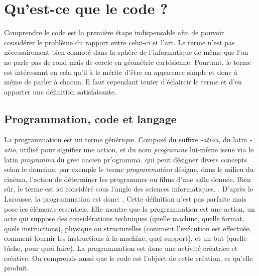 \documentclass[12pt]{article} %
\begin{document}
\section{Qu'est-ce que le code ?}
Comprendre le code est la première étape indispensable afin de pouvoir considérer le problème du rapport entre celui-ci et l'art. Le terme n'est pas nécessairement bien connoté dans la sphère de l'informatique de même que l'on ne parle pas de rond mais de cercle en géométrie cartésienne. Pourtant, le terme est intéressant en cela qu'il à le mérite d'être en apparence simple et donc à même de parler à chacun. Il faut cependant tenter d'éclaircir le terme et d'en apporter une définition satisfaisante.

\subsection{Programmation, code et langage}
La programmation est un terme générique. Composé du suffixe \textit{-ation}, du latin \textit{-atio}, utilisé pour signifier une action, et du nom \textit{programme} lui-même issue via le latin \textit{programma} du grec ancien \textgreek{pr'ogramma}.
qui peut désigner divers concepts selon le domaine, par exemple le terme \textit{programmation} désigne, dans le milieu du cinéma, l'action de déterminer les programmes ou films d'une salle donnée. Bien sûr, le terme est ici considéré sous l'angle des sciences informatiques.  \cite{Romero2017-mk}. D'après le Larousse, la programmation est donc: 
\cite{Nimmo2017-ya}. Cette définition n'est pas parfaite mais pose les éléments essentiels. Elle montre que la programmation est une action, un acte qui suppose des considérations techniques (quelle machine, quelle format, quels instructions), physique ou structurelles (comment l'exécution est effectuée, comment fournir les instructions à la machine, quel support), et un but (quelle tâche, pour quoi faire). La programmation est donc une activité créatrice et créative. On comprends aussi que le code est l'object de cette création, ce qu'elle produit.
\end{document}
